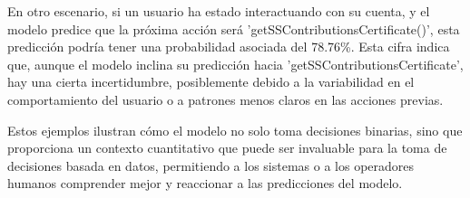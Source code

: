 En otro escenario, si un usuario ha estado interactuando con su cuenta, y el modelo predice que la próxima acción será 'getSSContributionsCertificate()', esta predicción podría tener una probabilidad asociada del 78.76\%. Esta cifra indica que, aunque el modelo inclina su predicción hacia 'getSSContributionsCertificate', hay una cierta incertidumbre, posiblemente debido a la variabilidad en el comportamiento del usuario o a patrones menos claros en las acciones previas.

Estos ejemplos ilustran cómo el modelo no solo toma decisiones binarias, sino que proporciona un contexto cuantitativo que puede ser invaluable para la toma de decisiones basada en datos, permitiendo a los sistemas o a los operadores humanos comprender mejor y reaccionar a las predicciones del modelo.